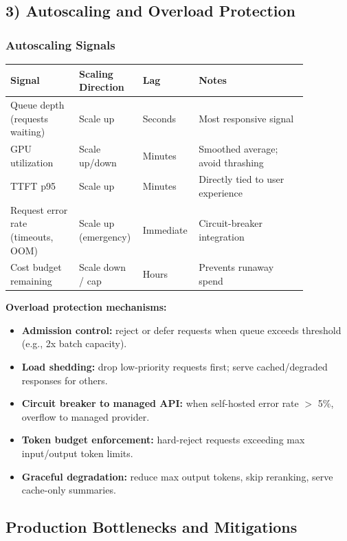 \subsection*{3) Autoscaling and Overload Protection}

\subsubsection*{Autoscaling Signals}

\small
\begin{tabular}{|p{0.22\linewidth}|p{0.17\linewidth}|p{0.12\linewidth}|p{0.35\linewidth}|}
\hline
\textbf{Signal} & \textbf{Scaling Direction} & \textbf{Lag} & \textbf{Notes} \\
\hline
Queue depth (requests waiting) & Scale up & Seconds & Most responsive signal \\
\hline
GPU utilization & Scale up/down & Minutes & Smoothed average; avoid thrashing \\
\hline
TTFT p95 & Scale up & Minutes & Directly tied to user experience \\
\hline
Request error rate (timeouts, OOM) & Scale up (emergency) & Immediate & Circuit-breaker integration \\
\hline
Cost budget remaining & Scale down / cap & Hours & Prevents runaway spend \\
\hline
\end{tabular}
\normalsize

\textbf{Overload protection mechanisms:}

\begin{itemize}
  \item \textbf{Admission control:} reject or defer requests when queue exceeds threshold (e.g., 2x batch capacity).
  \item \textbf{Load shedding:} drop low-priority requests first; serve cached/degraded responses for others.
  \item \textbf{Circuit breaker to managed API:} when self-hosted error rate $>$ 5\%, overflow to managed provider.
  \item \textbf{Token budget enforcement:} hard-reject requests exceeding max input/output token limits.
  \item \textbf{Graceful degradation:} reduce max output tokens, skip reranking, serve cache-only summaries.
\end{itemize}

\subsection*{Production Bottlenecks and Mitigations}

